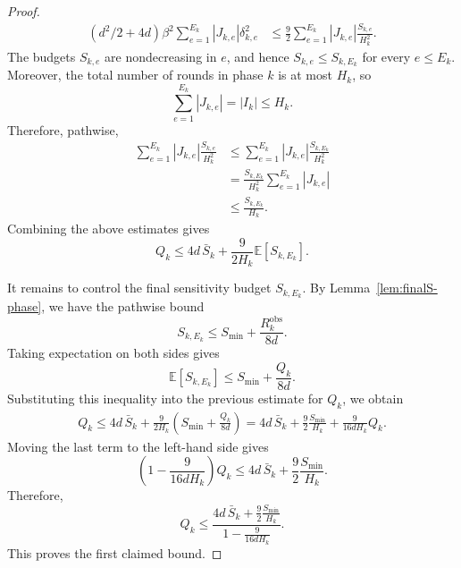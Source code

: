 \documentclass[10pt,a4paper]{amsart}
\begin{document}
\begin{proof}
\begin{equation*}
\begin{aligned}
    (d^2/2+4d)\beta^2
    \sum_{e=1}^{E_k}|J_{k,e}|\delta_{k,e}^2
    &\le
    \frac92
    \sum_{e=1}^{E_k}
    |J_{k,e}|\frac{S_{k,e}}{H_k^2}.
\end{aligned}
\end{equation*}
The budgets $S_{k,e}$ are nondecreasing in $e$, and hence
$S_{k,e}\le S_{k,E_k}$ for every $e\le E_k$. Moreover, the total number of
rounds in phase $k$ is at most $H_k$, so
\begin{equation*}
    \sum_{e=1}^{E_k}|J_{k,e}|=|I_k|\le H_k.
\end{equation*}
Therefore, pathwise,
\begin{equation*}
\begin{aligned}
    \sum_{e=1}^{E_k}
    |J_{k,e}|\frac{S_{k,e}}{H_k^2}
    &\le
    \sum_{e=1}^{E_k}
    |J_{k,e}|\frac{S_{k,E_k}}{H_k^2}  \\
    &=
    \frac{S_{k,E_k}}{H_k^2}
    \sum_{e=1}^{E_k}|J_{k,e}|  \\
    &\le
    \frac{S_{k,E_k}}{H_k}.
\end{aligned}
\end{equation*}
Combining the above estimates gives
\begin{equation*}
    Q_k
    \le
    4d\,\bar S_k
    +
    \frac{9}{2H_k}\mathbb E[S_{k,E_k}].
\end{equation*}

It remains to control the final sensitivity budget $S_{k,E_k}$. By
Lemma~\ref{lem:finalS-phase}, we have the pathwise bound
\begin{equation*}
    S_{k,E_k}
    \le
    S_{\min}
    +
    \frac{R_k^{\mathrm{obs}}}{8d}.
\end{equation*}
Taking expectation on both sides gives
\begin{equation*}
    \mathbb E[S_{k,E_k}]
    \le
    S_{\min}
    +
    \frac{Q_k}{8d}.
\end{equation*}
Substituting this inequality into the previous estimate for $Q_k$, we obtain
\begin{equation*}
\begin{aligned}
    Q_k
    \le
    4d\,\bar S_k
    +
    \frac{9}{2H_k}
    \left(
        S_{\min}
        +
        \frac{Q_k}{8d}
    \right)  =
    4d\,\bar S_k
    +
    \frac{9}{2}\frac{S_{\min}}{H_k}
    +
    \frac{9}{16dH_k}Q_k.
\end{aligned}
\end{equation*}
Moving the last term to the left-hand side gives
\begin{equation*}
    \left(
        1-\frac{9}{16dH_k}
    \right)Q_k
    \le
    4d\,\bar S_k
    +
    \frac{9}{2}\frac{S_{\min}}{H_k}.
\end{equation*}
Therefore,
\begin{equation*}
    Q_k
    \le
    \frac{
        4d\,\bar S_k+\frac{9}{2}\frac{S_{\min}}{H_k}
    }{
        1-\frac{9}{16dH_k}
    }.
\end{equation*}
This proves the first claimed bound.


\end{proof}
\end{document}
